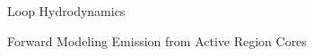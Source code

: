 \documentclass[final]{beamer}
\begin{document}
\begin{frame}
\begin{columns}[T]
\begin{column}{0.49\linewidth}
\begin{block}{Loop Hydrodynamics}
\begin{itemize}
    \end{itemize}
    \end{block}
    \begin{block}{Forward Modeling Emission from Active Region Cores}
    \begin{columns}[T]
        \begin{column}{0.49\columnwidth}
            \begin{figure}
\end{figure}
\end{column}
\end{columns}
\end{block}
\end{column}
\end{columns}
\end{frame}
\end{document}
